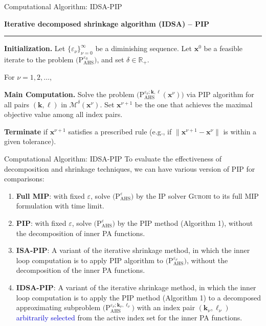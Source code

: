 \documentclass[aspectratio=169,xcolor=dvipsnames]{beamer}
\begin{document}
\begin{frame}{Computational Algorithm: IDSA-PIP}
  \small
  \setlength{\parskip}{0.10cm}

  \textbf{Iterative decomposed shrinkage algorithm (IDSA) -- PIP}

  \vspace{-0.04cm}
  {\color{MediumBlack}\rule{\linewidth}{0.4pt}}

  \textbf{Initialization.} Let $\{\varepsilon_\nu\}_{\nu=0}^{\infty}$ be a
  diminishing sequence. Let $\mathbf{x}^0$ be a feasible iterate to the problem
  $\bigl(\mathrm{P}^{\varepsilon_0}_{\mathrm{AHS}}\bigr)$, and set
  $\delta\in\mathbb{R}_+$.

  For $\nu=1,2,\ldots$,

  \textbf{Main Computation.} Solve the problem
  $\bigl(\mathrm{P}^{\varepsilon_\nu;\mathbf{k},\ell}_{\mathrm{AHS}}
  (\mathbf{x}^\nu)\bigr)$ via PIP algorithm for all pairs $(\mathbf{k},\ell)$ in
  $\mathcal{M}^\delta(\mathbf{x}^\nu)$. Set $\mathbf{x}^{\nu+1}$ be the one that
  achieves the maximal objective value among all index pairs.

  \textbf{Terminate} if $\mathbf{x}^{\nu+1}$ satisfies a prescribed rule (e.g.,
  if $\|\mathbf{x}^{\nu+1}-\mathbf{x}^\nu\|$ is within a given tolerance).
\end{frame}

\begin{frame}{Computational Algorithm: IDSA-PIP}
  \small
  To evaluate the effectiveness of decomposition and shrinkage techniques, we
  can have various version of PIP for comparisons:
  \begin{enumerate}
    \setlength{\itemsep}{0.12cm}
    \item \textbf{Full MIP}: with fixed $\varepsilon$, solve
      $\bigl(\mathrm{P}^{\varepsilon}_{\mathrm{AHS}}\bigr)$ by the IP solver
      \textsc{Gurobi} to its full MIP formulation with time limit.
    \item \textbf{PIP}: with fixed $\varepsilon$, solve
      $\bigl(\mathrm{P}^{\varepsilon}_{\mathrm{AHS}}\bigr)$ by the PIP method
      (Algorithm 1), without the decomposition of inner PA functions.
    \item \textbf{ISA-PIP}: A variant of the iterative shrinkage method, in
      which the inner loop computation is to apply PIP algorithm to
      $\bigl(\mathrm{P}^{\varepsilon_\nu}_{\mathrm{AHS}}\bigr)$, without the
      decomposition of the inner PA functions.
    \item \textbf{IDSA-PIP}: A variant of the iterative shrinkage method, in
      which the inner loop computation is to apply the PIP method (Algorithm 1)
      to a decomposed approximating subproblem
      $\bigl(\mathrm{P}^{\varepsilon_\nu;\mathbf{k}_\nu,\ell_\nu}_{\mathrm{AHS}}
      \bigr)$ with an index pair $(\mathbf{k}_\nu,\ell_\nu)$
      \textcolor{MediumBlue}{arbitrarily selected} from the active index set for
      the inner PA functions.
  \end{enumerate}
\end{frame}
\end{document}
